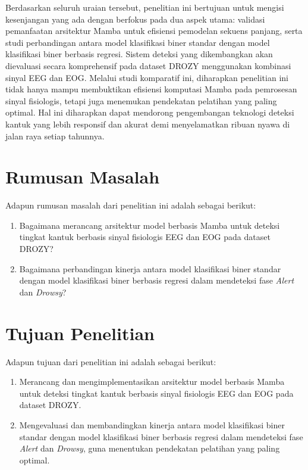     Berdasarkan seluruh uraian tersebut, penelitian ini bertujuan untuk mengisi kesenjangan yang ada dengan berfokus pada dua aspek utama: validasi pemanfaatan arsitektur Mamba untuk efisiensi pemodelan sekuens panjang, serta studi perbandingan antara model klasifikasi biner standar dengan model klasifikasi biner berbasis regresi. Sistem deteksi yang dikembangkan akan dievaluasi secara komprehensif pada dataset DROZY menggunakan kombinasi sinyal EEG dan EOG. Melalui studi komparatif ini, diharapkan penelitian ini tidak hanya mampu membuktikan efisiensi komputasi Mamba pada pemrosesan sinyal fisiologis, tetapi juga menemukan pendekatan pelatihan yang paling optimal. Hal ini diharapkan dapat mendorong pengembangan teknologi deteksi kantuk yang lebih responsif dan akurat demi menyelamatkan ribuan nyawa di jalan raya setiap tahunnya.

\section{Rumusan Masalah} \label{I.Rumusan Masalah}

Adapun rumusan masalah dari penelitian ini adalah sebagai berikut:

\begin{enumerate}
	\item Bagaimana merancang arsitektur model berbasis Mamba untuk deteksi tingkat kantuk berbasis sinyal fisiologis EEG dan EOG pada dataset DROZY?
	\item Bagaimana perbandingan kinerja antara model klasifikasi biner standar dengan model klasifikasi biner berbasis regresi dalam mendeteksi fase \textit{Alert} dan \textit{Drowsy}?
\end{enumerate}


\section{Tujuan Penelitian} \label{I.Tujuan}

Adapun tujuan dari penelitian ini adalah sebagai berikut:

\begin{enumerate}
	\item Merancang dan mengimplementasikan arsitektur model berbasis Mamba untuk deteksi tingkat kantuk berbasis sinyal fisiologis EEG dan EOG pada dataset DROZY.
	\item Mengevaluasi dan membandingkan kinerja antara model klasifikasi biner standar dengan model klasifikasi biner berbasis regresi dalam mendeteksi fase \textit{Alert} dan \textit{Drowsy}, guna menentukan pendekatan pelatihan yang paling optimal.
\end{enumerate}


